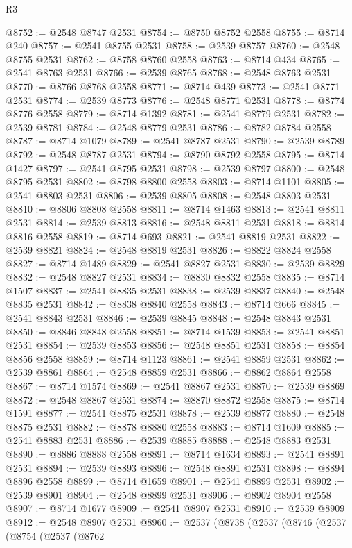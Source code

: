 \begin{lexlean}{R3}
\begin{coremodule}
@8752 := @2548 @8747 @2531
@8754 := @8750 @8752 @2558
@8755 := @8714 @240
@8757 := @2541 @8755 @2531
@8758 := @2539 @8757
@8760 := @2548 @8755 @2531
@8762 := @8758 @8760 @2558
@8763 := @8714 @434
@8765 := @2541 @8763 @2531
@8766 := @2539 @8765
@8768 := @2548 @8763 @2531
@8770 := @8766 @8768 @2558
@8771 := @8714 @439
@8773 := @2541 @8771 @2531
@8774 := @2539 @8773
@8776 := @2548 @8771 @2531
@8778 := @8774 @8776 @2558
@8779 := @8714 @1392
@8781 := @2541 @8779 @2531
@8782 := @2539 @8781
@8784 := @2548 @8779 @2531
@8786 := @8782 @8784 @2558
@8787 := @8714 @1079
@8789 := @2541 @8787 @2531
@8790 := @2539 @8789
@8792 := @2548 @8787 @2531
@8794 := @8790 @8792 @2558
@8795 := @8714 @1427
@8797 := @2541 @8795 @2531
@8798 := @2539 @8797
@8800 := @2548 @8795 @2531
@8802 := @8798 @8800 @2558
@8803 := @8714 @1101
@8805 := @2541 @8803 @2531
@8806 := @2539 @8805
@8808 := @2548 @8803 @2531
@8810 := @8806 @8808 @2558
@8811 := @8714 @1463
@8813 := @2541 @8811 @2531
@8814 := @2539 @8813
@8816 := @2548 @8811 @2531
@8818 := @8814 @8816 @2558
@8819 := @8714 @693
@8821 := @2541 @8819 @2531
@8822 := @2539 @8821
@8824 := @2548 @8819 @2531
@8826 := @8822 @8824 @2558
@8827 := @8714 @1489
@8829 := @2541 @8827 @2531
@8830 := @2539 @8829
@8832 := @2548 @8827 @2531
@8834 := @8830 @8832 @2558
@8835 := @8714 @1507
@8837 := @2541 @8835 @2531
@8838 := @2539 @8837
@8840 := @2548 @8835 @2531
@8842 := @8838 @8840 @2558
@8843 := @8714 @666
@8845 := @2541 @8843 @2531
@8846 := @2539 @8845
@8848 := @2548 @8843 @2531
@8850 := @8846 @8848 @2558
@8851 := @8714 @1539
@8853 := @2541 @8851 @2531
@8854 := @2539 @8853
@8856 := @2548 @8851 @2531
@8858 := @8854 @8856 @2558
@8859 := @8714 @1123
@8861 := @2541 @8859 @2531
@8862 := @2539 @8861
@8864 := @2548 @8859 @2531
@8866 := @8862 @8864 @2558
@8867 := @8714 @1574
@8869 := @2541 @8867 @2531
@8870 := @2539 @8869
@8872 := @2548 @8867 @2531
@8874 := @8870 @8872 @2558
@8875 := @8714 @1591
@8877 := @2541 @8875 @2531
@8878 := @2539 @8877
@8880 := @2548 @8875 @2531
@8882 := @8878 @8880 @2558
@8883 := @8714 @1609
@8885 := @2541 @8883 @2531
@8886 := @2539 @8885
@8888 := @2548 @8883 @2531
@8890 := @8886 @8888 @2558
@8891 := @8714 @1634
@8893 := @2541 @8891 @2531
@8894 := @2539 @8893
@8896 := @2548 @8891 @2531
@8898 := @8894 @8896 @2558
@8899 := @8714 @1659
@8901 := @2541 @8899 @2531
@8902 := @2539 @8901
@8904 := @2548 @8899 @2531
@8906 := @8902 @8904 @2558
@8907 := @8714 @1677
@8909 := @2541 @8907 @2531
@8910 := @2539 @8909
@8912 := @2548 @8907 @2531
@8960 := @2537
    (@8738
      (@2537
        (@8746
          (@2537
            (@8754
              (@2537
                (@8762

\end{coremodule}
\end{lexlean}
